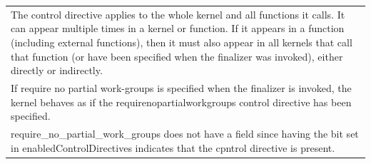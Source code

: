 \documentclass[final]{book}
\begin{document}
\begin{longtable}{@{\hspace{2em}}p{\linewidth-2em}}
The control directive applies to the whole kernel and all functions it calls. It can appear multiple times in a kernel or function. If it appears in a function (including external functions), then it must also appear in all kernels that call that function (or have been specified when the finalizer was invoked), either directly or indirectly.\\[2mm]
If require no partial work-groups is specified when the finalizer is invoked, the kernel behaves as if the requirenopartialworkgroups control directive has been specified.\\[2mm]
require_\-no_\-partial_\-work_\-groups does not have a field since having the bit set in enabledControlDirectives indicates that the cpntrol directive is present.
\end{longtable}
\end{document}
